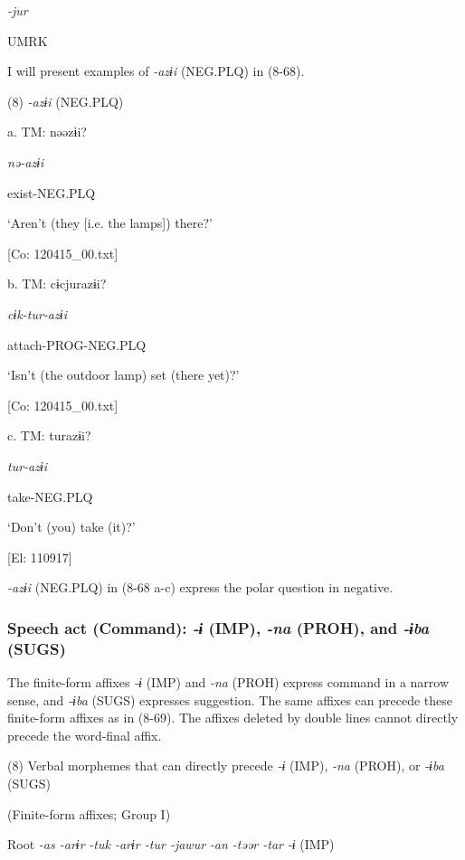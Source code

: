           \textit{{}-jur} 

          UMRK    

I will present examples of \textit{{}-azɨi} (NEG.PLQ) in (8-68).

(8)  \textit{{}-azɨi} (NEG.PLQ)

  a.  TM:  nəəzɨi?

      \textit{nə-azɨi}

      exist-NEG.PLQ

      ‘Aren’t (they [i.e. the lamps]) there?’

      [Co: 120415\_00.txt]

  b.  TM:  cɨcjurazɨi?

      \textit{cɨk-tur-azɨi}

      attach-PROG-NEG.PLQ

      ‘Isn’t (the outdoor lamp) set (there yet)?’

      [Co: 120415\_00.txt]

  c.  TM:  turazɨi?

      \textit{tur-azɨi}

      take-NEG.PLQ

      ‘Don’t (you) take (it)?’

      [El: 110917]

\textit{{}-azɨi} (NEG.PLQ) in (8-68 a-c) express the polar question in negative.

\subsubsection{Speech act (Command): \textit{{}-ɨ} (IMP), \textit{{}-na} (PROH), and \textit{{}-ɨba} (SUGS)}

The finite-form affixes \textit{{}-ɨ} (IMP) and \textit{{}-na} (PROH) express command in a narrow sense, and \textit{{}-ɨba} (SUGS) expresses suggestion. The same affixes can precede these finite-form affixes as in (8-69). The affixes deleted by double lines cannot directly precede the word-final affix.

(8)  Verbal morphemes that can directly precede \textit{-ɨ} (IMP), \textit{{}-na} (PROH), or \textit{{}-ɨba} (SUGS)

(Finite-form affixes; Group I)

  Root  \textit{{}-as  {}-arɨr} %
\textit{{}-tuk  {}-arɨr  {}-tur  {}-jawur} %
\textit{{}-an  {}-təər  {}-tar} %
\textit{{}-ɨ} (IMP)


